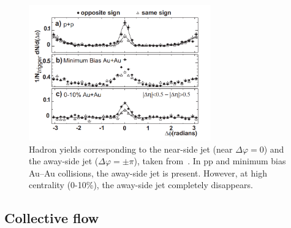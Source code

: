 \begin{figure}
    \centering
    \includegraphics[width=0.7\textwidth]{figures/introduction/star_jet_quenching.png}
    \caption{Hadron yields corresponding to the near-side jet (near $\Delta\varphi = 0$) and the away-side jet ($\Delta\varphi = \pm \pi$), taken from~\cite{STARJetQuenching}. In pp and minimum bias Au--Au collisions, the away-side jet is present. However, at high centrality (0-10\%), the away-side jet completely disappears.}
    \label{fig:star_jet_quenching}
\end{figure}


\clearpage 

\subsection{Collective flow}
\label{sec:collective_flow}

